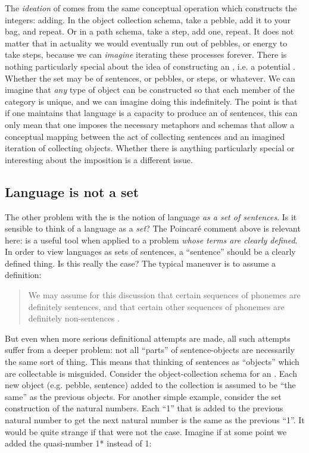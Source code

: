   The \textit{ideation} of  comes from the same conceptual operation which constructs the integers: adding. In the object collection schema, take a pebble, add it to your bag, and repeat. Or in a path schema, take a step, add one, repeat. It does not matter that in actuality we would eventually run out of pebbles, or energy to take steps, because we can \textit{imagine} iterating these processes forever. There is nothing particularly special about the idea of constructing an , i.e. a potential . Whether the set may be of sentences, or pebbles, or steps, or whatever. We can imagine that \textit{any} type of object can be constructed so that each member of the category is unique, and we can imagine doing this indefinitely. The point is that if one maintains that language is a capacity to produce an  of sentences, this can only mean that one imposes the necessary metaphors and schemas that allow a conceptual mapping between the act of collecting sentences and an imagined iteration of collecting objects. Whether there is anything particularly special or interesting about the imposition is a different issue.

\subsection{Language is not a set}

The other problem with the  is the notion of language \textit{as a set of sentences}. Is it sensible to think of a language as a \textit{set}? The Poincaré comment above is relevant here:  is a useful tool when applied to a problem \textit{whose terms are clearly defined}. In order to view languages as sets of sentences, a “sentence” should be a clearly defined thing. Is this really the case? The typical maneuver is to assume a definition:

\begin{quote}
We may assume for this discussion that certain sequences of phonemes are definitely sentences, and that certain other sequences of phonemes are definitely non-sentences \citep[14]{Chomsky1957}.
\end{quote}

  But even when more serious definitional attempts are made, all such attempts suffer from a deeper problem: not all “parts” of sentence-objects are necessarily the same sort of thing. This means that thinking of sentences as “objects” which are collectable is misguided. Consider the object-collection schema for an . Each new object (e.g. pebble, sentence) added to the collection is assumed to be “the same” as the previous objects. For another simple example, consider the set construction of the natural numbers. Each “1” that is added to the previous natural number to get the next natural number is the same as the previous “1”. It would be quite strange if that were not the case. Imagine if at some point we added the quasi-number 1* instead of 1:

